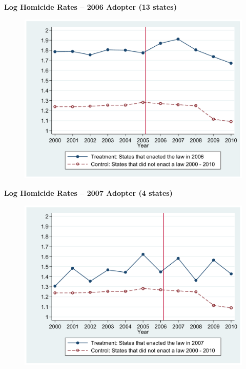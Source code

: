 \documentclass[notes=show]{beamer}
\begin{document}
\begin{frame}[plain]
	\begin{center}
	\textbf{Log Homicide Rates -- 2006 Adopter (13 states)}
	\end{center}
	
	\begin{figure}
	\includegraphics[scale=0.4]{./lecture_includes/cheng6.pdf}
	\end{figure}
\end{frame}

\begin{frame}[plain]
	\begin{center}
	\textbf{Log Homicide Rates -- 2007 Adopter (4 states)}
	\end{center}
	
	\begin{figure}
	\includegraphics[scale=0.4]{./lecture_includes/cheng7.pdf}
	\end{figure}
\end{frame}
\end{document}
